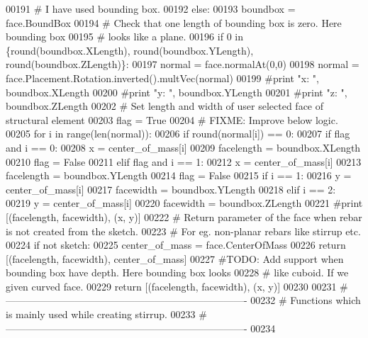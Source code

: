 \begin{DoxyCode}
00191     \textcolor{comment}{# I have used bounding box.}
00192     \textcolor{keywordflow}{else}:
00193         boundbox = face.BoundBox
00194         \textcolor{comment}{# Check that one length of bounding box is zero. Here bounding box}
00195         \textcolor{comment}{# looks like a plane.}
00196         \textcolor{keywordflow}{if} 0 \textcolor{keywordflow}{in} \{round(boundbox.XLength), round(boundbox.YLength), round(boundbox.ZLength)\}:
00197             normal = face.normalAt(0,0)
00198             normal = face.Placement.Rotation.inverted().multVec(normal)
00199             \textcolor{comment}{#print "x: ", boundbox.XLength}
00200             \textcolor{comment}{#print "y: ", boundbox.YLength}
00201             \textcolor{comment}{#print "z: ", boundbox.ZLength}
00202             \textcolor{comment}{# Set length and width of user selected face of structural element}
00203             flag = \textcolor{keyword}{True}
00204             \textcolor{comment}{# FIXME: Improve below logic.}
00205             \textcolor{keywordflow}{for} i \textcolor{keywordflow}{in} range(len(normal)):
00206                 \textcolor{keywordflow}{if} round(normal[i]) == 0:
00207                     \textcolor{keywordflow}{if} flag \textcolor{keywordflow}{and} i == 0:
00208                         x = center\_of\_mass[i]
00209                         facelength =  boundbox.XLength
00210                         flag = \textcolor{keyword}{False}
00211                     \textcolor{keywordflow}{elif} flag \textcolor{keywordflow}{and} i == 1:
00212                         x = center\_of\_mass[i]
00213                         facelength = boundbox.YLength
00214                         flag = \textcolor{keyword}{False}
00215                     \textcolor{keywordflow}{if} i == 1:
00216                         y = center\_of\_mass[i]
00217                         facewidth = boundbox.YLength
00218                     \textcolor{keywordflow}{elif} i == 2:
00219                         y = center\_of\_mass[i]
00220                         facewidth = boundbox.ZLength
00221             \textcolor{comment}{#print [(facelength, facewidth), (x, y)]}
00222     \textcolor{comment}{# Return parameter of the face when rebar is not created from the sketch.}
00223     \textcolor{comment}{# For eg. non-planar rebars like stirrup etc.}
00224     \textcolor{keywordflow}{if} \textcolor{keywordflow}{not} sketch:
00225         center\_of\_mass = face.CenterOfMass
00226         \textcolor{keywordflow}{return} [(facelength, facewidth), center\_of\_mass]
00227     \textcolor{comment}{#TODO: Add support when bounding box have depth. Here bounding box looks}
00228     \textcolor{comment}{# like cuboid. If we given curved face.}
00229     \textcolor{keywordflow}{return} [(facelength, facewidth), (x, y)]
00230 
00231 \textcolor{comment}{# -------------------------------------------------------------------------}
00232 \textcolor{comment}{# Functions which is mainly used while creating stirrup.}
00233 \textcolor{comment}{# -------------------------------------------------------------------------}
00234 
\end{DoxyCode}


